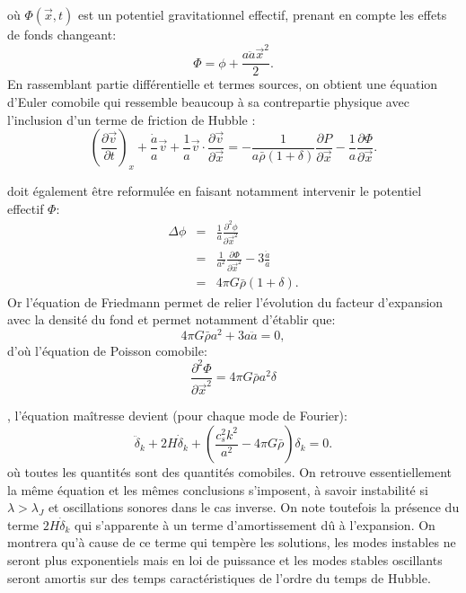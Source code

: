  où $\Phi(\vec x,t)$ est un potentiel gravitationnel effectif, prenant en compte les effets de fonds changeant:
 \begin{equation}
 \Phi= \phi+\frac{a\ddot a {\vec x}^2}{2}.
 \end{equation}
En rassemblant partie différentielle et termes sources, on obtient une équation d'Euler comobile qui ressemble beaucoup à sa contrepartie physique avec l'inclusion d'un terme de friction de Hubble :
\begin{equation}
\left(\frac{\partial \vec v}{\partial t}\right)_x +\frac{\dot a}{a}\vec v+\frac{1}{a}\vec v \cdot \frac{\partial \vec v}{\partial \vec x}=-\frac{1}{a\bar \rho (1+\delta)}\frac{\partial P}{\partial \vec x}-\frac{1}{a}\frac{\partial \Phi}{\partial \vec x}.
\end{equation}

 doit également être reformulée en faisant notamment intervenir le potentiel effectif $\Phi$:
\begin{eqnarray}
\Delta \phi &=&\frac{1}{a}\frac{\partial^2 \phi}{\partial \vec x^2}\\
&=&\frac{1}{a^2}\frac{\partial \Phi}{\partial \vec x^2}-3\frac{\ddot a}{a}\\
&=&4\pi G \bar \rho(1+\delta).
\end{eqnarray}
Or l'équation de Friedmann permet de relier l'évolution du facteur d'expansion avec la densité du fond et permet notamment d'établir que:
\begin{equation}
4\pi G \bar \rho a^2+3 a \ddot a=0,
\end{equation}
 d'où l'équation de Poisson comobile:
 \begin{equation}
 \frac{\partial^2 \Phi}{\partial \vec x^2}=4\pi G \bar \rho a^2 \delta
 \end{equation}
 
 , l'équation maîtresse devient (pour chaque mode de Fourier):
 \begin{equation}
  \ddot \delta_k +2H\dot \delta_k+ (\frac{c_s^2k ^2}{a^2}-4\pi G \bar \rho) \delta_k= 0.
  \label{e:epert}
 \end{equation}
 où toutes les quantités sont des quantités comobiles. On retrouve essentiellement la même équation et les mêmes conclusions s'imposent, à savoir instabilité si $\lambda >\lambda_J$ et oscillations sonores dans le cas inverse. On note toutefois la présence du terme $2H\dot \delta_k$ qui s'apparente à un terme d'amortissement dû à l'expansion. On montrera qu'à cause de ce terme qui tempère les solutions, les modes instables ne seront plus exponentiels mais en loi de puissance et les modes stables oscillants seront amortis sur des temps caractéristiques de l'ordre du temps de Hubble.
 
